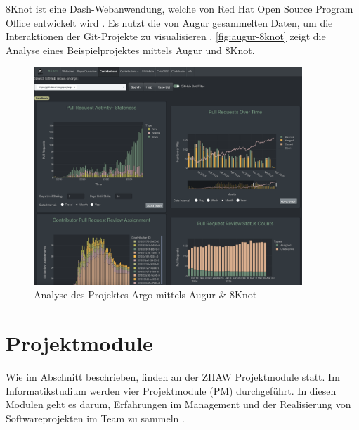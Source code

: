 8Knot ist eine Dash-Webanwendung, welche von Red Hat Open Source Program Office entwickelt wird \parencite{noauthor_measuring_nodate}. Es nutzt die von Augur gesammelten Daten, um die Interaktionen der Git-Projekte zu visualisieren \parencite{noauthor_chaossaugur_nodate}\parencite{noauthor_oss-aspen8knot_2025}. \autoref{fig:augur-8knot} zeigt die Analyse eines Beispielprojektes mittels Augur und 8Knot. 
\begin{figure}[htbp]
    \centering
    \includegraphics[width=0.9\textwidth]{Figures/augur-8knot.png}
    \caption{Analyse des Projektes Argo mittels Augur \& 8Knot \parencite{noauthor_metrixchaossio_nodate}\parencite{noauthor_argoprojargo-workflows_2025}}
    \label{fig:augur-8knot}
\end{figure}


\section{Projektmodule}
\label{sec:Projektmodule} 
Wie im Abschnitt  beschrieben, finden an der ZHAW Projektmodule statt. Im  Informatikstudium werden vier Projektmodule (PM) durchgeführt. In diesen Modulen geht es darum, Erfahrungen im Management und der Realisierung von Softwareprojekten im Team zu sammeln \parencite{noauthor_modul_nodate}. 

